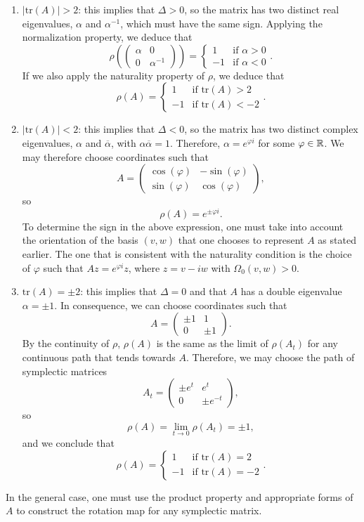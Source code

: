 \begin{enumerate}
	\item $|\text{tr}(A)| > 2$: this implies that $\Delta > 0$, so the matrix has two distinct real eigenvalues, $\alpha$ and $\alpha^{-1}$, which must have the same sign. Applying the normalization property, we deduce that
	\[\rho\left(\begin{pmatrix}\alpha & 0 \\ 0 & \alpha^{-1}\end{pmatrix}\right) = \left\{ \begin{array}{lc} 1 & \text{if } \alpha > 0 \\ -1 & \text{if } \alpha < 0 \end{array} \right. .\]
	If we also apply the naturality property of $\rho$, we deduce that
	\[\rho(A) = \left\{ \begin{array}{lc} 1 & \text{if tr}(A) > 2 \\ -1 & \text{if tr}(A) < -2 \end{array} \right. .\]
	\item $|\text{tr}(A)| < 2$: this implies that $\Delta < 0$, so the matrix has two distinct complex eigenvalues, $\alpha$ and $\overline{\alpha}$, with $\alpha\overline{\alpha} = 1$. Therefore, $\alpha = e^{\varphi i}$ for some $\varphi \in \mathbb{R}$. We may therefore choose coordinates such that
	\[A = \begin{pmatrix} \cos(\varphi) & -\sin(\varphi) \\ \sin(\varphi) & \cos(\varphi) \end{pmatrix} ,\]
	so
	\[\rho(A) = e^{\pm \varphi i} .\]
	To determine the sign in the above expression, one must take into account the orientation of the basis $(v,w)$ that one chooses to represent $A$ as stated earlier. The one that is consistent with the naturality condition is the choice of $\varphi$ such that $Az = e^{\varphi i} z$, where $z = v - iw$ with $\Omega_0(v,w) > 0$.
	\item $\text{tr}(A) = \pm 2$: this implies that $\Delta = 0$ and that $A$ has a double eigenvalue $\alpha = \pm 1$. In consequence, we can choose coordinates such that
	\[A = \begin{pmatrix} \pm 1 & 1 \\ 0 & \pm 1 \end{pmatrix} .\]
	By the continuity of $\rho$, $\rho(A)$ is the same as the limit of $\rho(A_t)$ for any continuous path that tends towards $A$. Therefore, we may choose the path of symplectic matrices
	\[A_t = \begin{pmatrix} \pm e^t & e^t \\ 0 & \pm e^{-t} \end{pmatrix} ,\]
	so
	\[\rho(A) = \lim_{t \rightarrow 0} \rho(A_t) = \pm 1 ,\]
	and we conclude that
	\[\rho(A) = \left\{ \begin{array}{lc} 1 & \text{if tr}(A) = 2 \\ -1 & \text{if tr}(A) = -2 \end{array} \right. .\]
\end{enumerate}

In the general case, one must use the product property and appropriate forms of $A$ to construct the rotation map for any symplectic matrix.
